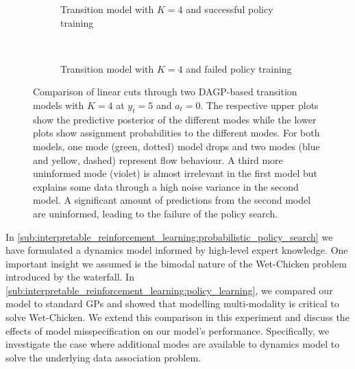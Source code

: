 \begin{figure}[tp]
    \centering
    \begin{subfigure}[t]{\linewidth}
        \centering
        
        
        \caption{
            \label{fig:interpretable_reinforcement_learning:wetchicken:good_cut}
            Transition model with $K=4$ and successful policy training
        }
    \end{subfigure}\\[\figureskip]
    \begin{subfigure}[t]{\linewidth}
        \centering
        
        
        \caption{
            \label{fig:interpretable_reinforcement_learning:wetchicken:bad_cut}
            Transition model with $K=4$ and failed policy training
        }
    \end{subfigure}
    \caption{
        \label{fig:interpretable_reinforcement_learning:wetchicken:cut_comparison}
        Comparison of linear cuts through two DAGP-based transition models with $K=4$ at $y_t = 5$ and $a_t=0$.
        The respective upper plots show the predictive posterior of the different modes while the lower plots show assignment probabilities to the different modes.
        For both models, one mode (green, dotted) model drops and two modes (blue and yellow, dashed) represent flow behaviour.
        A third more uninformed mode (violet) is almost irrelevant in the first model but explains some data through a high noise variance in the second model.
        A significant amount of predictions from the second model are uninformed, leading to the failure of the policy search.
    }
\end{figure}
In \cref{sub:interpretable_reinforcement_learning:probabilistic_policy_search} we have formulated a dynamics model informed by high-level expert knowledge.
One important insight we assumed is the bimodal nature of the Wet-Chicken problem introduced by the waterfall.
In \cref{sub:interpretable_reinforcement_learning:policy_learning}, we compared our model to standard GPs and showed that modelling multi-modality is critical to solve Wet-Chicken.
We extend this comparison in this experiment and discuss the effects of model misspecification on our model's performance.
Specifically, we investigate the case where additional modes are available to dynamics model to solve the underlying data association problem.

